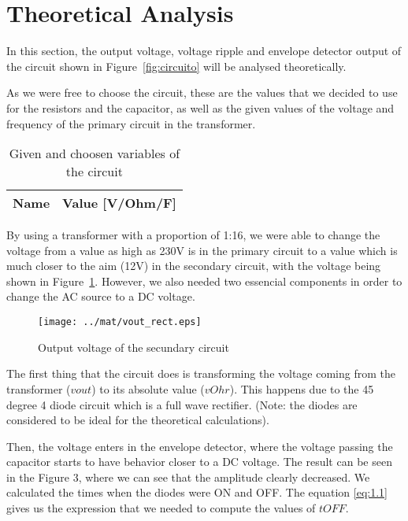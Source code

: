 \section{Theoretical Analysis}
\label{sec:analysis}

\hspace{0,5cm} In this section, the output voltage, voltage ripple and envelope detector output of the circuit shown in Figure~\ref{fig:circuito} will be analysed theoretically.

As we were free to choose the circuit, these are the values that we decided to use for the resistors and the capacitor, as well as the given values of the voltage and frequency of the primary circuit in the transformer.

\begin{table}[H]
  \centering
  \begin{tabular}{|l|r|}
    \hline    
    {\bf Name} & {\bf Value [V/Ohm/F]} \\ \hline
    
  \end{tabular}
  \caption{Given and choosen variables of the circuit}
  \label{tab:mat1}
\end{table}

By using a transformer with a proportion of 1:16, we were able to change the voltage from a value as high as 230V is in the primary circuit to a value which is much closer to the aim (12V) in the secondary circuit, with the voltage being shown in Figure~\ref{fig:mat2}. However, we also needed two essencial components in order to change the AC source to a DC voltage.

\begin{figure}[H] \centering
\texttt{[image: ../mat/vout\_rect.eps]}
\caption{Output voltage of the secundary circuit}
\label{fig:mat2}
\end{figure}

The first thing that the circuit does is transforming the voltage coming from the transformer ($vout$) to its absolute value ($vOhr$). This happens due to the 45 degree 4 diode circuit which is a full wave rectifier. (Note: the diodes are considered to be ideal for the theoretical calculations).

Then, the voltage enters in the envelope detector, where the voltage passing the capacitor starts to have behavior closer to a DC voltage. The result can be seen in the Figure 3, where we can see that the amplitude clearly decreased. We calculated the times when the diodes were ON and OFF. The equation \ref{eq:1.1} gives us the expression that we needed to compute the values of $tOFF$.

